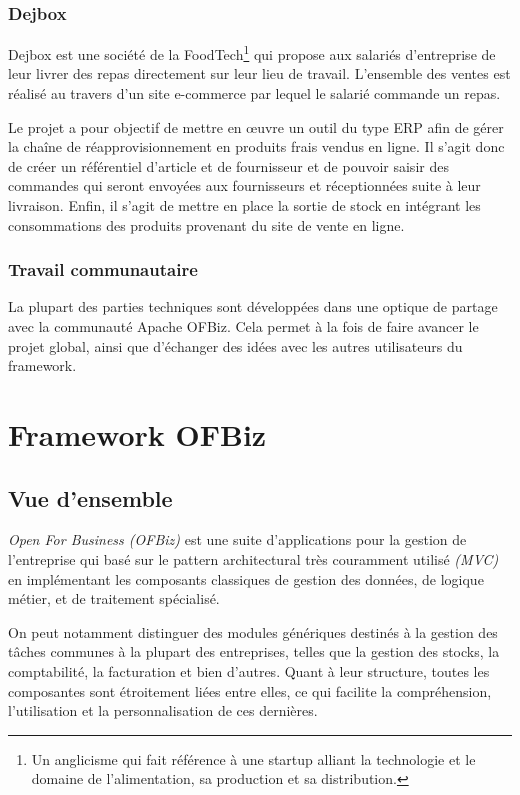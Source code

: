 \subsubsection{Dejbox}
\label{dejbox}
Dejbox est une société de la FoodTech\footnote{Un anglicisme qui fait référence à une startup alliant la technologie et le domaine de l’alimentation, sa production et sa distribution.} qui propose aux salariés d’entreprise de leur livrer des repas directement sur leur lieu de travail. L’ensemble des ventes est réalisé au travers d’un site e-commerce par lequel le salarié commande un repas.

Le projet a pour objectif de mettre en œuvre un outil du type ERP afin de gérer la chaîne de réapprovisionnement en produits frais vendus en ligne. Il s’agit donc de créer un référentiel d’article et de fournisseur et de pouvoir saisir des commandes qui seront envoyées aux fournisseurs et réceptionnées suite à leur livraison. Enfin, il s’agit de mettre en place la sortie de stock en intégrant les consommations des produits provenant du site de vente en ligne.

\subsubsection{Travail communautaire}
La plupart des parties techniques sont développées dans une optique de partage avec la communauté Apache OFBiz. Cela permet à la fois de faire avancer le projet global, ainsi que d'échanger des idées avec les autres utilisateurs du framework.  







\section{Framework OFBiz}
\subsection{Vue d'ensemble}
\emph{Open For Business (OFBiz)} est une suite d'applications pour la gestion de l'entreprise qui basé sur le pattern architectural très couramment utilisé \emph{(MVC)} en implémentant les composants classiques de gestion des données, de logique métier, et de traitement spécialisé.

On peut notamment distinguer des modules génériques destinés à la gestion des tâches communes à la plupart des entreprises, telles que la gestion des stocks, la comptabilité, la facturation et bien d'autres. Quant à leur structure, toutes les composantes sont étroitement liées entre elles, ce qui facilite la compréhension, l'utilisation et la personnalisation de ces dernières. 


